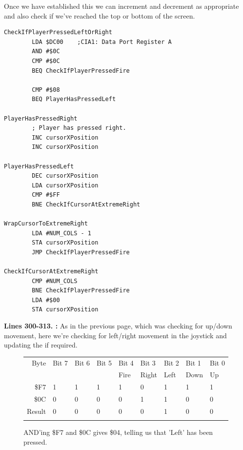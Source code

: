 Once we have established this we can increment and decrement  as appropriate and also check
if we've reached the top or bottom of the screen. 
\clearpage
\begin{lstlisting}[caption= Second part of the Interrupt Handler.]
CheckIfPlayerPressedLeftOrRight   
        LDA $DC00    ;CIA1: Data Port Register A
        AND #$0C
        CMP #$0C
        BEQ CheckIfPlayerPressedFire

        CMP #$08
        BEQ PlayerHasPressedLeft

PlayerHasPressedRight
        ; Player has pressed right.
        INC cursorXPosition
        INC cursorXPosition

PlayerHasPressedLeft   
        DEC cursorXPosition
        LDA cursorXPosition
        CMP #$FF
        BNE CheckIfCursorAtExtremeRight

WrapCursorToExtremeRight
        LDA #NUM_COLS - 1
        STA cursorXPosition
        JMP CheckIfPlayerPressedFire

CheckIfCursorAtExtremeRight   
        CMP #NUM_COLS
        BNE CheckIfPlayerPressedFire
        LDA #$00
        STA cursorXPosition

\end{lstlisting}
\clearpage
{}
\textbf{Lines 300-313. :} As in the previous page, which was checking
for up/down movement, here we're checking for left/right movement in the joystick and updating the  if required.

\begin{figure}[H]
  {
    \setlength{\tabcolsep}{3.0pt}
    \setlength\cmidrulewidth{\heavyrulewidth} %
    \begin{adjustbox}{width=7cm,center}

      \begin{tabular}{rllllllll}
        \toprule
        Byte & Bit 7 & Bit 6 & Bit 5 & Bit 4 & Bit 3 & Bit 2 & Bit 1 & Bit 0        \\
             &       &       &       & Fire  & Right & Left  & Down  & Up           \\
        \midrule
        \$F7 & 1 & 1 & 1 & 1 & 0 & 1 & 1 & 1 \\
        \$0C & 0 & 0 & 0 & 0 & 1 & 1 & 0 & 0 \\
        \midrule
        Result & 0 & 0 & 0 & 0 & 0 & 1 & 0 & 0 \\
        \addlinespace
        \bottomrule
      \end{tabular}
    \end{adjustbox}
    }\caption*{AND'ing \$F7 and \$0C gives \$04, telling us that 'Left' has been pressed.}
\end{figure}

